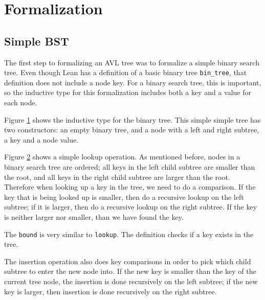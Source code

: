 \section{Formalization}

\subsection{Simple BST}
The first step to formalizing an AVL tree was to formalize a simple binary search tree. Even though Lean has a definition of a basic binary tree 
\lstinline{bin_tree}, that definition does not include a node key. For a binary search tree, this is important, so the inductive type for this formalization includes 
both a key and a value for each node.

\begin{figure}[!ht]
  
  \caption{}
  \label{fig:btree_simple}
\end{figure}

Figure \ref{fig:btree_simple} shows the inductive type for the binary tree. This simple simple tree has two
constructors: an empty binary tree, and a node with a left and right subtree, a key and a node value.

Figure \ref{fig:lookup_simple} shows a simple lookup operation. As mentioned before, nodes in a binary search tree are ordered; all keys in the left child subtree are smaller than the root,
and all keys in the right child subtree are larger than the root. Therefore when looking up a key in the tree, we need to do a comparison. If the key that is being looked up is smaller, then do a recursive lookup
on the left subtree; if it is larger, then do a recursive lookup on the right subtree. If the key is neither larger nor smaller, than we have found the key.

The \lstinline{bound} is very similar to \lstinline{lookup}. The definition checks if a key exists in the tree.

\begin{figure}[!ht]
  
  \caption{}
  \label{fig:lookup_simple}
\end{figure}

\begin{figure}[!ht]
  
  \caption{}
  \label{fig:bound_simple}
\end{figure}

The insertion operation also does key comparisons in order to pick which child subtree to enter the new node into. If the new key is smaller than the 
key of the current tree node, the insertion is done recursively on the left subtree; if the new key is larger, then insertion is done recursively on the
right subtree.
